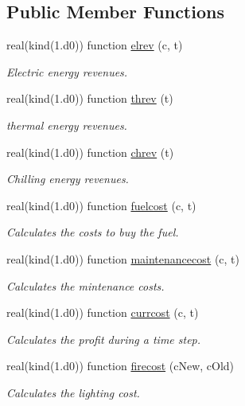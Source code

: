 \subsection*{Public Member Functions}
\begin{DoxyCompactItemize}
\item 
real(kind(1.d0)) function \hyperlink{classeconomy_a4ce4c9a69167d8912d6f6bcb6ec5b53d}{elrev} (c, t)
\begin{DoxyCompactList}\small\item\em Electric energy revenues. \end{DoxyCompactList}\item 
real(kind(1.d0)) function \hyperlink{classeconomy_a89bad0bc0b64f4480938f31adfa3ec33}{threv} (t)
\begin{DoxyCompactList}\small\item\em thermal energy revenues. \end{DoxyCompactList}\item 
real(kind(1.d0)) function \hyperlink{classeconomy_ae4b1f9fc807735c83f9b8afedd25593f}{chrev} (t)
\begin{DoxyCompactList}\small\item\em Chilling energy revenues. \end{DoxyCompactList}\item 
real(kind(1.d0)) function \hyperlink{classeconomy_a6037f7db113255ec913f030454cfebbd}{fuelcost} (c, t)
\begin{DoxyCompactList}\small\item\em Calculates the costs to buy the fuel. \end{DoxyCompactList}\item 
real(kind(1.d0)) function \hyperlink{classeconomy_a5dac453402a93bcbfc5c4f5a0a9c296e}{maintenancecost} (c, t)
\begin{DoxyCompactList}\small\item\em Calculates the mintenance costs. \end{DoxyCompactList}\item 
real(kind(1.d0)) function \hyperlink{classeconomy_a94cd41a52844693de595358d30d4d78f}{currcost} (c, t)
\begin{DoxyCompactList}\small\item\em Calculates the profit during a time step. \end{DoxyCompactList}\item 
real(kind(1.d0)) function \hyperlink{classeconomy_a7fc5b61af90717efa0515636fc74c732}{firecost} (c\-New, c\-Old)
\begin{DoxyCompactList}\small\item\em Calculates the lighting cost. \end{DoxyCompactList}\end{DoxyCompactItemize}


